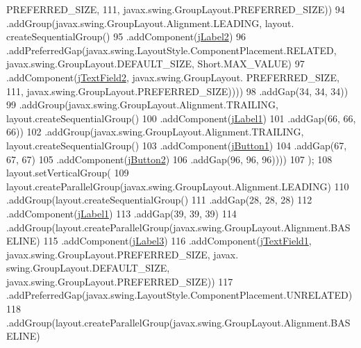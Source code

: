 \begin{DoxyCode}
      PREFERRED\_SIZE, 111, javax.swing.GroupLayout.PREFERRED\_SIZE))
94                                 .addGroup(javax.swing.GroupLayout.Alignment.LEADING, layout.
      createSequentialGroup()
95                                     .addComponent(\mbox{\hyperlink{classsoftware_1_1registrar_a24b0c3144951c1a694a839a57632b467}{jLabel2}})
96                                     .addPreferredGap(javax.swing.LayoutStyle.ComponentPlacement.RELATED, 
      javax.swing.GroupLayout.DEFAULT\_SIZE, Short.MAX\_VALUE)
97                                     .addComponent(\mbox{\hyperlink{classsoftware_1_1registrar_a3270231d8e402db892c290279dcdb893}{jTextField2}}, javax.swing.GroupLayout.
      PREFERRED\_SIZE, 111, javax.swing.GroupLayout.PREFERRED\_SIZE))))
98                         .addGap(34, 34, 34))
99                     .addGroup(javax.swing.GroupLayout.Alignment.TRAILING, layout.createSequentialGroup()
100                         .addComponent(\mbox{\hyperlink{classsoftware_1_1registrar_a110efbfc5ad3341638ea3ee89aa6f204}{jLabel1}})
101                         .addGap(66, 66, 66))
102                     .addGroup(javax.swing.GroupLayout.Alignment.TRAILING, layout.createSequentialGroup()
103                         .addComponent(\mbox{\hyperlink{classsoftware_1_1registrar_aef5c4d6cf5be63bd07f311ce4f590faf}{jButton1}})
104                         .addGap(67, 67, 67)
105                         .addComponent(\mbox{\hyperlink{classsoftware_1_1registrar_aad55bb3040eec6aa4685c2641dbff85b}{jButton2}})
106                         .addGap(96, 96, 96))))
107         );
108         layout.setVerticalGroup(
109             layout.createParallelGroup(javax.swing.GroupLayout.Alignment.LEADING)
110             .addGroup(layout.createSequentialGroup()
111                 .addGap(28, 28, 28)
112                 .addComponent(\mbox{\hyperlink{classsoftware_1_1registrar_a110efbfc5ad3341638ea3ee89aa6f204}{jLabel1}})
113                 .addGap(39, 39, 39)
114                 .addGroup(layout.createParallelGroup(javax.swing.GroupLayout.Alignment.BASELINE)
115                     .addComponent(\mbox{\hyperlink{classsoftware_1_1registrar_ab18af739a7842cf44586f9f1ccf4cb5d}{jLabel3}})
116                     .addComponent(\mbox{\hyperlink{classsoftware_1_1registrar_a530c642d7e5cc327ce37e22d77ae4172}{jTextField1}}, javax.swing.GroupLayout.PREFERRED\_SIZE, javax.
      swing.GroupLayout.DEFAULT\_SIZE, javax.swing.GroupLayout.PREFERRED\_SIZE))
117                 .addPreferredGap(javax.swing.LayoutStyle.ComponentPlacement.UNRELATED)
118                 .addGroup(layout.createParallelGroup(javax.swing.GroupLayout.Alignment.BASELINE)

\end{DoxyCode}
